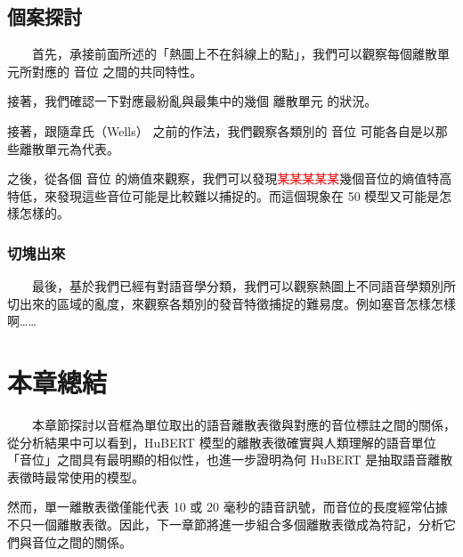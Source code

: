 \subsection{個案探討}  %

　　首先，承接前面所述的「熱圖上不在斜線上的點」，我們可以觀察每個離散單元所對應的 音位 之間的共同特性。

        接著，我們確認一下對應最紛亂與最集中的幾個 離散單元 的狀況。

        接著，跟隨韋氏（Wells）\cite{wells_phonetic_2022} 之前的作法，我們觀察各類別的 音位 可能各自是以那些離散單元為代表。

        之後，從各個 音位 的熵值來觀察，我們可以發現\textcolor{red}{某某某某某}幾個音位的熵值特高特低，來發現這些音位可能是比較難以捕捉的。而這個現象在 50 模型又可能是怎樣怎樣的。

\subsubsection{切塊出來}

　　最後，基於我們已經有對語音學分類，我們可以觀察熱圖上不同語音學類別所切出來的區域的亂度，來觀察各類別的發音特徵捕捉的難易度。例如塞音怎樣怎樣啊……

{


\section{本章總結}

　　本章節探討以音框為單位取出的語音離散表徵與對應的音位標註之間的關係，從分析結果中可以看到，HuBERT 模型的離散表徵確實與人類理解的語音單位「音位」之間具有最明顯的相似性，也進一步證明為何 HuBERT 是抽取語音離散表徵時最常使用的模型。

        然而，單一離散表徵僅能代表 10 或 20 毫秒的語音訊號，而音位的長度經常佔據不只一個離散表徵。因此，下一章節將進一步組合多個離散表徵成為符記，分析它們與音位之間的關係。



}
